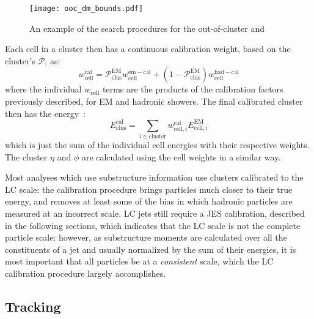 
\begin{figure}
\centering
\texttt{[image: ooc\_dm\_bounds.pdf]}
\label{fig:jet-reconstruction:cluster-calibration:ooc-dm}
\caption{An example of the search procedures for the out-of-cluster and }
\end{figure}



Each cell in a cluster then has a continuous calibration weight, based on the cluster's $\mathcal{P}$, as:
%
\begin{equation}
w_\mathrm{cell}^\mathrm{cal} = \mathcal{P}^\mathrm{EM}_\mathrm{clus} w_\mathrm{cell}^\mathrm{em-cal} + (1 - \mathcal{P}_\mathrm{clus}^\mathrm{EM}) w_\mathrm{cell}^\mathrm{had-cal}
\end{equation}
%
where the individual $w_\mathrm{cell}$ terms are the products of the calibration factors previously described, for EM and hadronic showers. The final calibrated cluster then has the energy~\cite{Loch:1967028}:
%
\begin{equation}
E^\mathrm{cal}_\mathrm{clus} = \sum_{i \in \mathrm{cluster}} w_{\mathrm{cell},i}^\mathrm{cal} E_{\mathrm{cell},i}^\mathrm{EM}
\end{equation}
%
which is just the sum of the individual cell energies with their respective weights. The cluster $\eta$ and $\phi$ are calculated using the cell weights in a similar way.

Most analyses which use substructure information use clusters calibrated to the LC scale: the calibration procedure brings particles much closer to their true energy, and removes at least some of the bias in which hadronic particles are measured at an incorrect scale. LC jets still require a JES calibration, described in the following sections, which indicates that the LC scale is not the complete particle scale: however, as substructure moments are calculated over all the constituents of a jet and usually normalized by the sum of their energies, it is most important that all particles be at a \textit{consistent} scale, which the LC calibration procedure largely accomplishes.

\subsection{Tracking}
\label{tracking}


